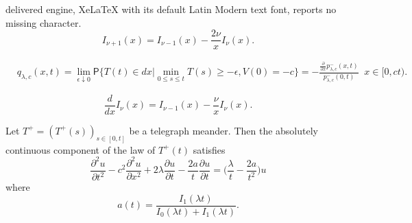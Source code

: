 \documentclass[10pt,a4paper]{amsart}
\begin{document}
delivered engine, XeLaTeX with its default Latin Modern text font, reports no missing character.
\begin{equation}\label{properties Bessel}
I_{\nu+1}(x) = I_{\nu-1}(x)-\frac{2\nu}{x}I_\nu(x).
\end{equation}

\begin{align}\label{Telegraph meander t 4}
&q_{\lambda,c}(x,t) = \lim_{\epsilon \downarrow 0}\mathsf{P}\{T(t) \in dx \lvert \min_{0\leq s \leq t} T(s) \geq -\epsilon,V(0) = -c\} =-\frac{\frac{\partial}{\partial x}p^{-}_{\lambda,c}(x,t)}{p_{\lambda,c}^{-}(0,t)} \;\; x \in [0,ct).
\end{align}

\begin{equation}\label{properties derivative Bessel}
\frac{d}{dx}I_\nu(x) = I_{\nu-1}(x) - \frac{\nu}{x}I_\nu(x).
\end{equation}

\begin{theorem}
Let $T^+ = (T^+(s))_{s \in [0,t]}$ be a telegraph meander. Then the absolutely continuous component of the law of $T^+(t)$ satisfies 
\begin{equation}\label{pde telegraph meander}
\frac{\partial^2u}{\partial t^2}-c^2\frac{\partial^2 u}{\partial x^2}+2\lambda\frac{\partial u}{\partial  t}-\frac{2a}{t}\frac{\partial u}{\partial t}=\Big(\frac{\lambda}{t}-\frac{2a}{ t^2}\Big)u
\end{equation}
where 
\begin{equation}
a(t) = \frac{I_1(\lambda t)}{I_0(\lambda t)+I_1(\lambda t)}.
\end{equation}
\end{theorem}
\end{document}

